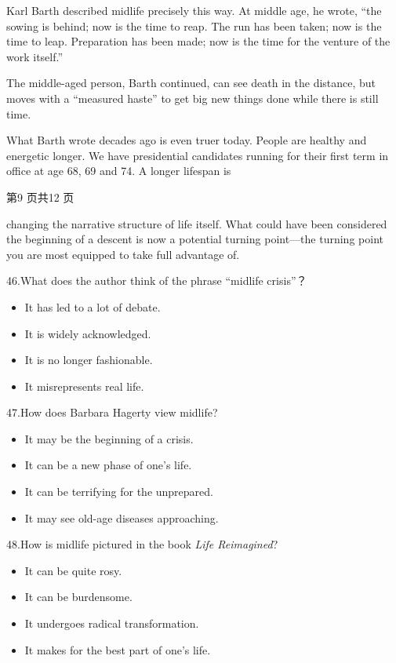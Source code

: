 \documentclass[UTF8,11pt]{ctexart}
\begin{document}
Karl Barth described midlife precisely this way. At middle age, he wrote, “the sowing is behind; now is the time to reap. The run has been taken; now is the time to leap. Preparation has been made; now is the time for the venture of the work itself.”


The middle-aged person, Barth continued, can see death in the distance, but moves with a “measured haste” to get big new things done while there is still time.


What Barth wrote decades ago is even truer today. People are healthy and energetic longer. We have presidential candidates running for their first term in office at age 68, 69 and 74. A longer lifespan is


第9 页共12 页


changing the narrative structure of life itself. What could have been considered the beginning of a descent is now a potential turning point—the turning point you are most equipped to take full advantage of.


46.What does the author think of the phrase “midlife crisis”？


\begin{itemize}[leftmargin=2em,itemsep=.2em,topsep=.4em]\item[A.] It has led to a lot of debate.
\item[B.] It is widely acknowledged.
\item[C.] It is no longer fashionable.
\item[D.] It misrepresents real life.
\end{itemize}

47.How does Barbara Hagerty view midlife?


\begin{itemize}[leftmargin=2em,itemsep=.2em,topsep=.4em]\item[A.] It may be the beginning of a crisis.
\item[B.] It can be a new phase of one’s life.
\item[C.] It can be terrifying for the unprepared.
\item[D.] It may see old-age diseases approaching.
\end{itemize}

48.How is midlife pictured in the book\textit{ Life Reimagined}?


\begin{itemize}[leftmargin=2em,itemsep=.2em,topsep=.4em]\item[A.] It can be quite rosy.
\item[B.] It can be burdensome.
\item[C.] It undergoes radical transformation.
\item[D.] It makes for the best part of one’s life.
\end{itemize}
\end{document}
